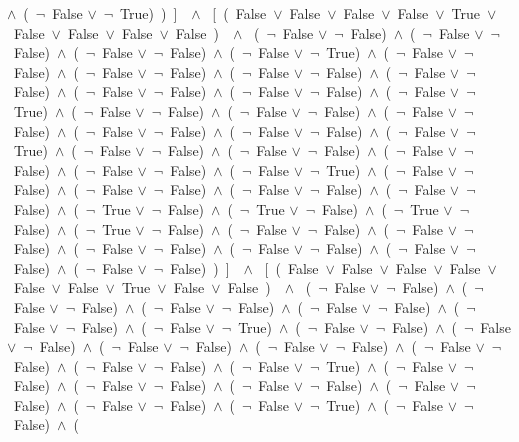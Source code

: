 ﻿\documentclass[a4paper,10pt]{article}
\begin{document}
$\wedge$\ (\  $\neg$\ False $\vee$\  $\neg$\ True)\ )\ ]\ \ $\wedge$ \ [\ (\ False\ $\vee$\ False\ $\vee$\ False\ $\vee$\ False\ $\vee$\ True\ $\vee$\ False\ $\vee$\ False\ $\vee$\ False\ $\vee$\ False\ )\ \ $\wedge$ \ (\  $\neg$\ False $\vee$\  $\neg$\ False)\ $\wedge$\ (\  $\neg$\ False $\vee$\  $\neg$\ False)\ $\wedge$\ (\  $\neg$\ False $\vee$\  $\neg$\ False)\ $\wedge$\ (\  $\neg$\ False $\vee$\  $\neg$\ True)\ $\wedge$\ (\  $\neg$\ False $\vee$\  $\neg$\ False)\ $\wedge$\ (\  $\neg$\ False $\vee$\  $\neg$\ False)\ $\wedge$\ (\  $\neg$\ False $\vee$\  $\neg$\ False)\ $\wedge$\ (\  $\neg$\ False $\vee$\  $\neg$\ False)\ $\wedge$\ (\  $\neg$\ False $\vee$\  $\neg$\ False)\ $\wedge$\ (\  $\neg$\ False $\vee$\  $\neg$\ False)\ $\wedge$\ (\  $\neg$\ False $\vee$\  $\neg$\ True)\ $\wedge$\ (\  $\neg$\ False $\vee$\  $\neg$\ False)\ $\wedge$\ (\  $\neg$\ False $\vee$\  $\neg$\ False)\ $\wedge$\ (\  $\neg$\ False $\vee$\  $\neg$\ False)\ $\wedge$\ (\  $\neg$\ False $\vee$\  $\neg$\ False)\ $\wedge$\ (\  $\neg$\ False $\vee$\  $\neg$\ False)\ $\wedge$\ (\  $\neg$\ False $\vee$\  $\neg$\ True)\ $\wedge$\ (\  $\neg$\ False $\vee$\  $\neg$\ False)\ $\wedge$\ (\  $\neg$\ False $\vee$\  $\neg$\ False)\ $\wedge$\ (\  $\neg$\ False $\vee$\  $\neg$\ False)\ $\wedge$\ (\  $\neg$\ False $\vee$\  $\neg$\ False)\ $\wedge$\ (\  $\neg$\ False $\vee$\  $\neg$\ True)\ $\wedge$\ (\  $\neg$\ False $\vee$\  $\neg$\ False)\ $\wedge$\ (\  $\neg$\ False $\vee$\  $\neg$\ False)\ $\wedge$\ (\  $\neg$\ False $\vee$\  $\neg$\ False)\ $\wedge$\ (\  $\neg$\ False $\vee$\  $\neg$\ False)\ $\wedge$\ (\  $\neg$\ True $\vee$\  $\neg$\ False)\ $\wedge$\ (\  $\neg$\ True $\vee$\  $\neg$\ False)\ $\wedge$\ (\  $\neg$\ True $\vee$\  $\neg$\ False)\ $\wedge$\ (\  $\neg$\ True $\vee$\  $\neg$\ False)\ $\wedge$\ (\  $\neg$\ False $\vee$\  $\neg$\ False)\ $\wedge$\ (\  $\neg$\ False $\vee$\  $\neg$\ False)\ $\wedge$\ (\  $\neg$\ False $\vee$\  $\neg$\ False)\ $\wedge$\ (\  $\neg$\ False $\vee$\  $\neg$\ False)\ $\wedge$\ (\  $\neg$\ False $\vee$\  $\neg$\ False)\ $\wedge$\ (\  $\neg$\ False $\vee$\  $\neg$\ False)\ )\ ]\ \ $\wedge$ \ [\ (\ False\ $\vee$\ False\ $\vee$\ False\ $\vee$\ False\ $\vee$\ False\ $\vee$\ False\ $\vee$\ True\ $\vee$\ False\ $\vee$\ False\ )\ \ $\wedge$ \ (\  $\neg$\ False $\vee$\  $\neg$\ False)\ $\wedge$\ (\  $\neg$\ False $\vee$\  $\neg$\ False)\ $\wedge$\ (\  $\neg$\ False $\vee$\  $\neg$\ False)\ $\wedge$\ (\  $\neg$\ False $\vee$\  $\neg$\ False)\ $\wedge$\ (\  $\neg$\ False $\vee$\  $\neg$\ False)\ $\wedge$\ (\  $\neg$\ False $\vee$\  $\neg$\ True)\ $\wedge$\ (\  $\neg$\ False $\vee$\  $\neg$\ False)\ $\wedge$\ (\  $\neg$\ False $\vee$\  $\neg$\ False)\ $\wedge$\ (\  $\neg$\ False $\vee$\  $\neg$\ False)\ $\wedge$\ (\  $\neg$\ False $\vee$\  $\neg$\ False)\ $\wedge$\ (\  $\neg$\ False $\vee$\  $\neg$\ False)\ $\wedge$\ (\  $\neg$\ False $\vee$\  $\neg$\ False)\ $\wedge$\ (\  $\neg$\ False $\vee$\  $\neg$\ True)\ $\wedge$\ (\  $\neg$\ False $\vee$\  $\neg$\ False)\ $\wedge$\ (\  $\neg$\ False $\vee$\  $\neg$\ False)\ $\wedge$\ (\  $\neg$\ False $\vee$\  $\neg$\ False)\ $\wedge$\ (\  $\neg$\ False $\vee$\  $\neg$\ False)\ $\wedge$\ (\  $\neg$\ False $\vee$\  $\neg$\ False)\ $\wedge$\ (\  $\neg$\ False $\vee$\  $\neg$\ True)\ $\wedge$\ (\  $\neg$\ False $\vee$\  $\neg$\ False)\ $\wedge$\ (\ 
\end{document}
